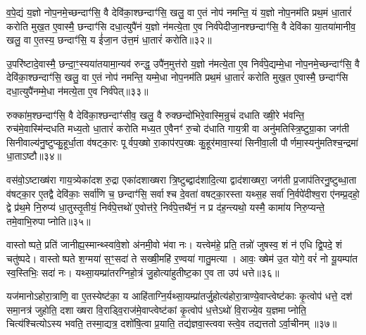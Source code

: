 व॒पे॒द्यं य॒ज्ञो नोप॒नमे॒च्छन्दाꣳ॑सि॒ वै देवि॑का॒श्छन्दाꣳ॑सि॒ खलु॒ वा ए॒तं नोप॑ नमन्ति॒ यं य॒ज्ञो नोप॒नम॑ति प्रथ॒मं धा॒तारं॑ करोति मुख॒त ए॒वास्मै॒ छन्दाꣳ॑सि दधा॒त्युपै॑नं य॒ज्ञो न॑मत्ये॒ता ए॒व निर्व॑पेदीजा॒नश्छन्दाꣳ॑सि॒ वै देवि॑का या॒तया॑मानीव॒ खलु॒ वा ए॒तस्य॒ छन्दाꣳ॑सि॒ य ई॑जा॒न उ॑त्त॒मं धा॒तारं॑ करोति॥३२॥

उ॒परि॑ष्टादे॒वास्मै॒ छन्दा॒ꣳ॒स्यया॑तयामा॒न्यव॑ रुन्द्ध॒ उपै॑न॒मुत्त॑रो य॒ज्ञो न॑मत्ये॒ता ए॒व निर्व॑पे॒द्यम्मे॒धा नोप॒नमे॒च्छन्दाꣳ॑सि॒ वै देवि॑का॒श्छन्दाꣳ॑सि॒ खलु॒ वा ए॒तं नोप॑ नमन्ति॒ यम्मे॒धा नोप॒नम॑ति प्रथ॒मं धा॒तारं॑ करोति मुख॒त ए॒वास्मै॒ छन्दाꣳ॑सि दधा॒त्युपै॑नम्मे॒धा न॑मत्ये॒ता ए॒व निर्व॑पेत्॥३३॥

रुक्का॑म॒श्छन्दाꣳ॑सि॒ वै देवि॑का॒श्छन्दाꣳ॑सीव॒ खलु॒ वै रुक्छन्दो॑भिरे॒वास्मि॒न्रुचं॑ दधाति ख्षी॒रे भ॑वन्ति॒ रुच॑मे॒वास्मि॑न्दधति मध्य॒तो धा॒तारं॑ करोति मध्य॒त ए॒वैनꣳ॑ रु॒चो द॑धाति गाय॒त्री वा अनु॑मतिस्त्रि॒ष्टुग्रा॒का जग॑ती सिनीवाल्य॑नु॒ष्टुप्कु॒हूर्धा॒ता व॑षट्का॒रः पूर्वप॒ख्षो रा॒काप॑रप॒ख्षः कु॒हूर॑मावा॒स्या॑ सिनीवा॒ली पौर्णमा॒स्यनु॑मतिश्च॒न्द्रमा॑ धा॒ताऽष्टौ॥३४॥

वस॑वो॒ऽष्टाख्ष॑रा गाय॒त्र्येका॑दश रु॒द्रा एका॑दशाख्षरा त्रि॒ष्टुब्द्वाद॑शादि॒त्या द्वाद॑शाख्षरा॒ जग॑ती प्र॒जाप॑तिरनु॒ष्टुब्धा॒ता व॑षट्का॒र ए॒तद्वै देवि॑काः॒ सर्वा॑णि च॒ छन्दाꣳ॑सि॒ सर्वाश्च दे॒वता॑ वषट्का॒रस्ता यथ्स॒ह सर्वा॑ नि॒र्वपे॑दीश्व॒रा ए॑नम्प्र॒दहो॒ द्वे प्र॑थ॒मे नि॒रुप्य॑ धा॒तुस्तृ॒तीयं॒ निर्व॑पे॒त्तथो॑ ए॒वोत्त॑रे॒ निर्व॑पे॒त्तथै॑नं॒ न प्र द॑ह॒न्त्यथो॒ यस्मै॒ कामा॑य निरु॒प्यन्ते॒ तमे॒वाभि॒रुपाप्नोति॥३५॥

{\anuvakamend[{प॒शुका॑म॒श्छन्दाꣳ॑सि॒ वै देवि॑का॒श्छन्दाꣳ॑सि॒ ग्राम॑ङ्कल्पयत्ये॒ता ए॒व निरु॑त्त॒मन्धा॒तारं॑ करोति मे॒धा न॑मत्ये॒ता ए॒व निर्व॑पेद॒ष्टौ द॑हन्ति॒ नव॑ च॥९॥ देविकाः प्रजाकामो मिथुनी पशुकाम}]}

वास्तोष्पते॒ प्रति॑ जानीह्य॒स्मान्थ्स्वा॑वे॒शो अ॑नमी॒वो भ॑वा नः। यत्त्वेम॑हे॒ प्रति॒ तन्नो॑ जुषस्व॒ शं न॑ एधि द्वि॒पदे॒ शं चतु॑ष्पदे। वास्तोष्पते श॒ग्मया॑ स॒ꣳ॒सदा॑ ते सख्षी॒महि॑ र॒ण्वया॑ गातु॒मत्या। आवः॒ ख्षेम॑ उ॒त योगे॒ वरं॑ नो यू॒यम्पा॑त स्व॒स्तिभिः॒ सदा॑ नः। यथ्सा॒यम्प्रा॑तरग्निहो॒त्रं जु॒होत्या॑हुतीष्ट॒का ए॒व ता उप॑ धत्ते॥३६॥

यज॑मानोऽहोरा॒त्राणि॒ वा ए॒तस्येष्ट॑का॒ य आहि॑ताग्नि॒र्यथ्सा॒यम्प्रा॑तर्जु॒होत्य॑होरा॒त्राण्ये॒वाप्त्वेष्ट॑काः कृ॒त्वोप॑ धत्ते॒ दश॑ समा॒नत्र॑ जुहोति॒ दशाख्षरा वि॒राड्वि॒राज॑मे॒वाप्त्वेष्ट॑कां कृ॒त्वोप॑ ध॒त्तेऽथो॑ वि॒राज्ये॒व य॒ज्ञमाप्नोति॒ चित्य॑श्चित्योऽस्य भवति॒ तस्मा॒द्यत्र॒ दशो॑षि॒त्वा प्र॒याति॒ तद्य॑ज्ञवा॒स्त्ववास्त्वे॒व तद्यत्ततोऽर्वा॒चीनम्॥३७॥

